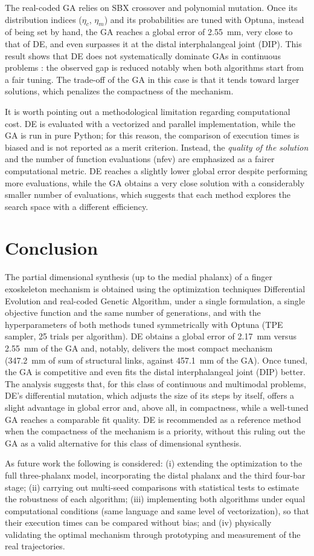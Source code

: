 \documentclass[conference]{IEEEtran}
\begin{document}
The real-coded GA relies on SBX crossover and polynomial mutation. Once its
distribution indices ($\eta_c$, $\eta_m$) and its probabilities are tuned with
Optuna, instead of being set by hand, the GA reaches a global error of 2.55~mm,
very close to that of DE, and even surpasses it at the distal interphalangeal
joint (DIP). This result shows that DE does not systematically dominate GAs in
continuous problems \cite{ref_de_vs_ga,ref_ga_pso_de}: the observed gap is
reduced notably when both algorithms start from a fair tuning. The trade-off of
the GA in this case is that it tends toward larger solutions, which penalizes the
compactness of the mechanism.

It is worth pointing out a methodological limitation regarding computational cost.
DE is evaluated with a vectorized and parallel implementation, while the GA is
run in pure Python; for this reason, the comparison of execution times is biased
and is not reported as a merit criterion. Instead, the \emph{quality of the
solution} and the number of function evaluations (nfev) are emphasized as a fairer
computational metric. DE reaches a slightly lower global error despite performing
more evaluations, while the GA obtains a very close solution with a considerably
smaller number of evaluations, which suggests that each method explores the search
space with a different efficiency.

\section{Conclusion}
The partial dimensional synthesis (up to the medial phalanx) of a finger
exoskeleton mechanism is obtained using the optimization techniques Differential
Evolution and real-coded Genetic Algorithm, under a single formulation, a single
objective function and the same number of generations, and with the
hyperparameters of both methods tuned symmetrically with Optuna (TPE sampler, 25
trials per algorithm). DE obtains a global error of 2.17~mm versus 2.55~mm of the
GA and, notably, delivers the most compact mechanism (347.2~mm of sum of
structural links, against 457.1~mm of the GA). Once tuned, the GA is competitive
and even fits the distal interphalangeal joint (DIP) better. The analysis suggests
that, for this class of continuous and multimodal problems, DE's differential
mutation, which adjusts the size of its steps by itself, offers a slight advantage
in global error and, above all, in compactness, while a well-tuned GA reaches a
comparable fit quality. DE is recommended as a reference method when the
compactness of the mechanism is a priority, without this ruling out the GA as a
valid alternative for this class of dimensional synthesis.

As future work the following is considered: (i) extending the optimization to the
full three-phalanx model, incorporating the distal phalanx and the third four-bar
stage; (ii) carrying out multi-seed comparisons with statistical tests to estimate
the robustness of each algorithm; (iii) implementing both algorithms under equal
computational conditions (same language and same level of vectorization), so that
their execution times can be compared without bias; and (iv) physically validating
the optimal mechanism through prototyping and measurement of the real trajectories.

\end{document}
